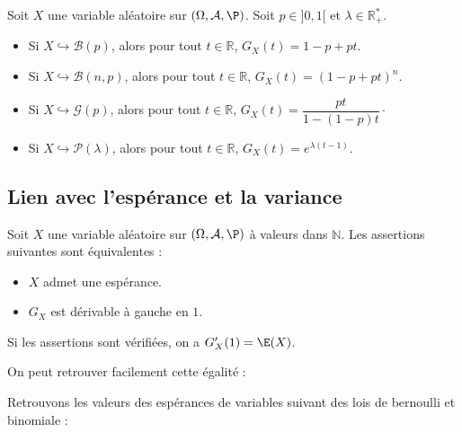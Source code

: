 \documentclass[a4paper,10pt]{report}
\begin{document}
\begin{prop}
Soit $X$ une variable aléatoire sur $(\Omega, \mathcal{A}, \P)$. Soit $p \in ]0,1[$ et $\lambda \in \mathbb{R}_+^{*}$.

\begin{itemize}
\item Si $X \hookrightarrow \mathcal{B}(p)$, alors pour tout $t \in \mathbb{R}$, $G_X(t)=1-p+pt$.
\item Si $X \hookrightarrow \mathcal{B}(n,p)$,  alors pour tout $t \in \mathbb{R}$, $G_X(t)=(1-p+pt)^n$.
\item Si $X \hookrightarrow \mathcal{G}(p)$,  alors pour tout $t \in \mathbb{R}$, $G_X(t)=\dfrac{pt}{1-(1-p)t}\cdot$
\item Si $X \hookrightarrow \mathcal{P}(\lambda)$,  alors pour tout $t \in \mathbb{R}$, $G_X(t)=e^{\lambda(t-1)}$.
\end{itemize}
\end{prop}

\begin{preuve}

\vspace{10cm}
\end{preuve}

\subsection{Lien avec l'espérance et la variance}

\begin{prop} Soit $X$ une variable aléatoire sur $(\Omega, \mathcal{A}, \P)$ à valeurs dans $\mathbb{N}$. Les assertions suivantes sont équivalentes :

\begin{itemize}
\item $X$ admet une espérance.
\item $G_X$ est dérivable à gauche en $1$.
\end{itemize}
Si les assertions sont vérifiées, on a $G_X'(1)=\E(X)$.
\end{prop}

\begin{rem} On peut retrouver facilement cette égalité :

\vspace{3cm}
\end{rem}

\begin{ex} Retrouvons les valeurs des espérances de variables suivant des lois de bernoulli et binomiale :

\vspace{5cm}
\end{ex}
\end{document}
